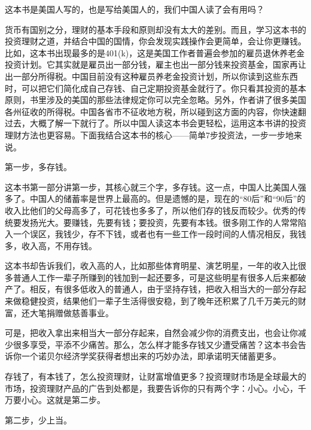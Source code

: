 这本书是美国人写的，也是写给美国人的，我们中国人读了会有用吗？

货币有国别之分，理财的基本手段和原则却没有太大的差别。而且，学习这本书的投资理财之道，并结合中国的国情，你会发现实践操作会更简单，会让你更赚钱。比如，这本书出现最多的是401(k)，这是美国工作者普遍会参加的雇员退休养老金投资计划。它其实就是雇员出一部分钱，雇主也出一部分钱来投资基金，国家再让出一部分所得税。中国目前没有这种雇员养老金投资计划，所以你读到这些东西时，可以把它们简化成自己存钱、自己定期投资基金就行了。你只看其投资的基本原则，书里涉及的美国的那些法律规定你可以完全忽略。另外，作者讲了很多美国各州征收的所得税。中国各省市不征收地方税，所以碰到这方面的内容，你快速翻过去，大概了解一下就行了。所以中国人读这本书会更轻松，运用这本书讲的投资理财方法也更容易。下面我结合这本书的核心——简单7步投资法，一步一步地来说。

第一步，多存钱。

这本书第一部分讲第一步，其核心就三个字，多存钱。这一点，中国人比美国人强多了。中国人的储蓄率是世界上最高的。但是遗憾的是，现在的“80后”和“90后”的收入比他们的父母高多了，可花钱也多多了，所以他们存的钱反而较少。优秀的传统要发扬光大。要赚钱，先要有钱；要投资，先要有本钱。很多刚工作的人常常陷入一个误区，我钱少，存不下钱，或者也有一些工作一段时间的人情况相反，我钱多，收入高，不用存钱。

这本书却告诉我们，收入高的人，比如那些体育明星、演艺明星，一年的收入比很多普通人工作一辈子所赚到的钱加到一起还要多，可是这些明星有很多人后来都破产了。相反，有很多低收入的普通人，由于坚持存钱，把收入相当大的一部分存起来做稳健投资，结果他们一辈子生活得很安稳，到了晚年还积累了几千万美元的财富，还大笔捐赠做慈善事业。

可是，把收入拿出来相当大一部分存起来，自然会减少你的消费支出，也会让你减少很多享受，平添不少痛苦。那么，怎么样才能多存钱又少遭受痛苦？这本书会告诉你一个诺贝尔经济学奖获得者想出来的巧妙办法，即承诺明天储蓄更多。

存钱了，有本钱了，怎么投资理财，让财富增值更多？投资理财市场是全球最大的市场，投资理财产品的广告到处都是，我要告诉你的只有两个字：小心。小心，千万要小心。这就是第二步。

第二步，少上当。

